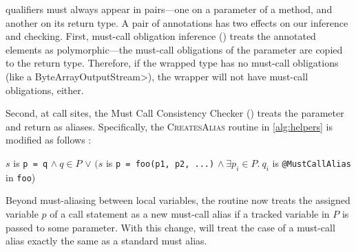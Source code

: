 \mccannot qualifiers must always appear in pairs---one on a parameter of a
method, and another on its return type.  A pair of \mccannot annotations has two
effects on our inference and checking.  First, must-call obligation inference ()
treats the annotated elements as polymorphic---the must-call obligations of the
parameter are copied to the return type. Therefore, if the wrapped type has no
must-call obligations (like a \<ByteArrayOutputStream>),
the wrapper will not have must-call obligations, either.

Second, at call sites, the Must Call Consistency Checker
() treats the \mccannot parameter and return as
aliases.  Specifically, the \textsc{CreatesAlias} routine in \cref{alg:helpers} is
modified as follows :
\begin{algorithmic}
    \State \Return $s$ is \lstinline{p = q} $\wedge\ q \in P$ \newline
         \hspace*{4.5em} $\vee$ $(s$ is \lstinline{p = foo(p1, p2, ...)} \newline
         \hspace*{6em} $\wedge\ \exists p_i \in P.\ q_i$ is
         \lstinline{@MustCallAlias} in \lstinline{foo})
    \EndProcedure
\end{algorithmic}
Beyond must-aliasing between local variables, the routine now treats the
assigned variable $p$ of a call statement as a new must-call alias if a tracked
variable in $P$ is passed to some \mccannot parameter.
With this change,  will treat the case of a
must-call alias exactly the same as a standard must alias.

